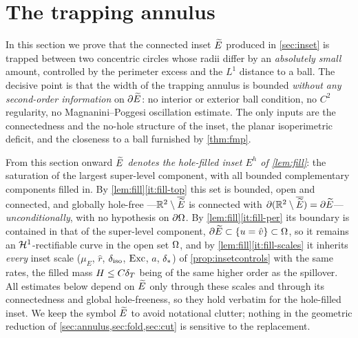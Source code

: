\section{The trapping annulus}\label{sec:annulus}

In this section we prove that the connected inset $\widetilde{E}$ produced in
\cref{sec:inset} is trapped between two concentric circles whose radii
differ by an \emph{absolutely small} amount, controlled by the perimeter
excess and the $L^1$ distance to a ball. The decisive point is that the
width of the trapping annulus is bounded \emph{without any second-order
information} on $\partial\widetilde{E}$: no interior or exterior ball condition, no
$C^2$ regularity, no Magnanini--Poggesi oscillation estimate. The only
inputs are the connectedness and the no-hole structure of the inset, the
planar isoperimetric deficit, and the closeness to a ball furnished by
\cref{thm:fmp}.

\begin{remark}\label{conv:fill}
From this section onward \emph{$\widetilde{E}$ denotes the hole-filled inset $E^h$ of
\cref{lem:fill}}: the saturation of the largest super-level component, with
all bounded complementary components filled in. By \cref{lem:fill}\ref{it:fill-top}
this set is bounded, open and connected, and globally hole-free
---$\mathbb{R}^2\setminus\overline{\widetilde{E}}$ is connected with
$\partial(\mathbb{R}^2\setminus\overline{\widetilde{E}})=\partial\widetilde{E}$--- \emph{unconditionally},
with no hypothesis on $\partial\Omega$. By \cref{lem:fill}\ref{it:fill-per} its
boundary is contained in that of the super-level component, $\partial\widetilde{E}
\subset\left\{u=\hat v\right\}\subset\Omega$, so it remains an $\mathcal{H}^1$-rectifiable curve
in the open set $\Omega$, and by \cref{lem:fill}\ref{it:fill-scales} it inherits
\emph{every} inset scale ($\mu_E$, $\hat r$, $\delta_{\mathrm{iso}}$, $\mathrm{Exc}$, $a$, $\delta_{*}$)
of \cref{prop:insetcontrols} with the same rates, the filled mass $H\le C\delta_T$
being of the same higher order as the spillover. All estimates below depend on
$\widetilde{E}$ only through these scales and through its connectedness and global
hole-freeness, so they hold verbatim for the hole-filled inset. We keep the
symbol $\widetilde{E}$ to avoid notational clutter; nothing in the geometric reduction
of \cref{sec:annulus,sec:fold,sec:cut} is sensitive to the replacement.
\end{remark}

